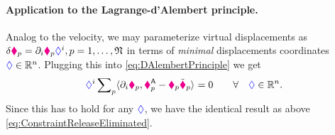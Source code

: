 \paragraph{Application to the Lagrange-d'Alembert principle.}
Analog to the velocity, we may parameterize virtual displacements as $\delta \boldsymbol{\textcolor{magenta}{\blacklozenge}}_{p} = \partial_{i} \boldsymbol{\textcolor{magenta}{\blacklozenge}}_{p} \textcolor{blue}{\Diamond}^{i}, p = 1,\ldots,\mathfrak{N}$ in terms of \textit{minimal} displacements coordinates $\boldsymbol{\textcolor{blue}{\Diamond}}\in\mathbb{R}^n$.
Plugging this into \eqref{eq:DAlembertPrinciple} we get
\begin{align}\label{eq:DAlembertPrincipleBasis}
 \textcolor{blue}{\Diamond}^{i} \sum\nolimits_{p} \langle \partial_{i} \boldsymbol{\textcolor{magenta}{\blacklozenge}}_{p} , \boldsymbol{\textcolor{magenta}{\blacklozenge}}_{p}^{\mathsf{A}} - \textcolor{magenta}{\blacklozenge}_{p}\ddot{\boldsymbol{\textcolor{magenta}{\blacklozenge}}}_{p} \rangle_{} = 0 \qquad \forall \quad \boldsymbol{\textcolor{blue}{\Diamond}}\in\mathbb{R}^n.
\end{align}
Since this has to hold for any $\boldsymbol{\textcolor{blue}{\Diamond}}$, we have the identical result as above \eqref{eq:ConstraintReleaseEliminated}.

